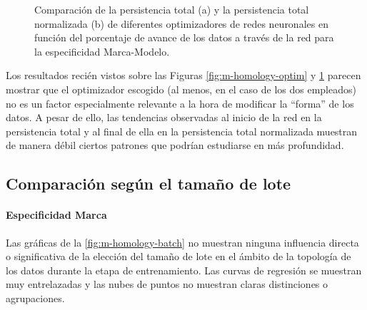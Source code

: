 \begin{figure}[H]
\begin{subfigure}
		\caption{Persistencia total normalizada según el porcentaje de avance en la
			red para optimizadores SGD y Adam.}
		\label{fig:mm-homology-optim-2}
	\end{subfigure}
	\caption{Comparación de la persistencia total (a) y la persistencia total
		normalizada (b) de diferentes optimizadores de redes neuronales en función del
		porcentaje de avance de los datos a través de la red para la especificidad
		Marca-Modelo.}
	\label{fig:mm-homology-optim}
\end{figure}

Los resultados recién vistos sobre las Figuras \ref{fig:m-homology-optim} y \ref{fig:mm-homology-optim}
parecen mostrar que el optimizador escogido (al menos, en el caso de los dos empleados)
no es un factor especialmente relevante a la hora de modificar la \enquote{forma}
de los datos. A pesar de ello, las tendencias observadas al inicio de la red en la
persistencia total y al final de ella en la persistencia total normalizada muestran
de manera débil ciertos patrones que podrían estudiarse en más profundidad.

\subsection{Comparación según el tamaño de lote}
\label{subsec:batch}

\paragraph{Especificidad Marca}

Las gráficas de la \autoref{fig:m-homology-batch} no muestran ninguna influencia
directa o significativa de la elección del tamaño de lote en el ámbito de la
topología de los datos durante la etapa de entrenamiento. Las curvas de regresión
se muestran muy entrelazadas y las nubes de puntos no muestran claras distinciones
o agrupaciones.


